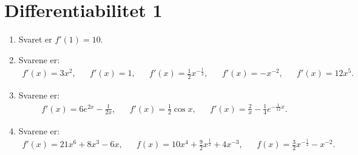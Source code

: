 \newpage
\section{Differentiabilitet 1}
\begin{enumerate}
	\item Svaret er $f'(1)=10$.

	\item Svarene er:
	\begin{align*}
	f'(x)=3x^2,&& f'(x)=1,&& f'(x)=\frac{1}{2}x^{-\frac{1}{2}},&& f'(x)=-x^{-2},&& f'(x)=12x^5.
	\end{align*}
	
	\item Svarene er: 
	\begin{align*}
	f'(x)=6e^{2x}-\frac{1}{2x},&& f'(x)=\frac{1}{2}\cos x,&& f'(x)=\frac{2}{x}-\frac{1}{4}e^{-\frac{1}{12}x}.
	\end{align*}
	
	\item Svarene er:
	\begin{align*}
	f'(x)=21x^6+8x^3-6x,&&f(x)=10x^4+\frac{9}{2}x^{\frac{1}{2}}+4x^{-3},&&f(x)=\frac{3}{2}x^{-\frac{1}{2}}-x^{-2}.
	\end{align*}
	

\end{enumerate}
